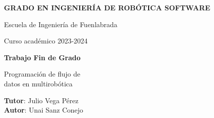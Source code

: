 \thispagestyle{empty}
\vspace{2cm}

\begin{figure}[htb]
  \centerline{}
\end{figure}

\begin{center}
  {\Large {\bf GRADO EN INGENIERÍA DE ROBÓTICA SOFTWARE}}
  \vspace{5mm}
 
  {\large {Escuela de Ingeniería de Fuenlabrada}}
  \vspace{5mm}

  {\large {Curso académico 2023-2024}}

  \vspace{1cm}

  {\large {\bf Trabajo Fin de Grado}}

  \vspace{2cm}


  {\Large { Programación de flujo de\\
            datos en multirobótica\\[1cm] }}

  \vspace{5cm}
  {\bf Tutor}: Julio Vega Pérez \\
  {\bf Autor}: Unai Sanz Conejo
\end{center}

\clearpage
\thispagestyle{empty}
